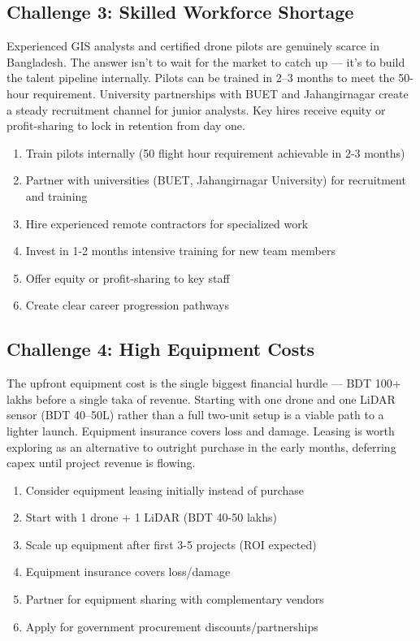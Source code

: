 \subsection{Challenge 3: Skilled Workforce Shortage}

Experienced GIS analysts and certified drone pilots are genuinely scarce in Bangladesh. The answer isn't to wait for the market to catch up --- it's to build the talent pipeline internally. Pilots can be trained in 2--3 months to meet the 50-hour requirement. University partnerships with BUET and Jahangirnagar create a steady recruitment channel for junior analysts. Key hires receive equity or profit-sharing to lock in retention from day one.

\begin{enumerate}
    \item Train pilots internally (50 flight hour requirement achievable in 2-3 months)
    \item Partner with universities (BUET, Jahangirnagar University) for recruitment and training
    \item Hire experienced remote contractors for specialized work
    \item Invest in 1-2 months intensive training for new team members
    \item Offer equity or profit-sharing to key staff
    \item Create clear career progression pathways
\end{enumerate}

\subsection{Challenge 4: High Equipment Costs}

The upfront equipment cost is the single biggest financial hurdle --- BDT 100+ lakhs before a single taka of revenue. Starting with one drone and one LiDAR sensor (BDT 40--50L) rather than a full two-unit setup is a viable path to a lighter launch. Equipment insurance covers loss and damage. Leasing is worth exploring as an alternative to outright purchase in the early months, deferring capex until project revenue is flowing.

\begin{enumerate}
    \item Consider equipment leasing initially instead of purchase
    \item Start with 1 drone + 1 LiDAR (BDT 40-50 lakhs)
    \item Scale up equipment after first 3-5 projects (ROI expected)
    \item Equipment insurance covers loss/damage
    \item Partner for equipment sharing with complementary vendors
    \item Apply for government procurement discounts/partnerships
\end{enumerate}

